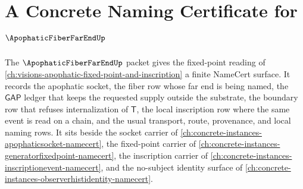 \chapter{A Concrete Naming Certificate for $\ApophaticFiberFarEndUp$}
\label{ch:concrete-instances-apophaticfiberfarend-namecert}

The $\ApophaticFiberFarEndUp$ packet gives the fixed-point reading of \autoref{ch:visions-apophatic-fixed-point-and-inscription} a finite NameCert surface. It records the apophatic socket, the fiber row whose far end is being named, the $\mathsf{GAP}$ ledger that keeps the requested supply outside the substrate, the boundary row that refuses internalization of $\mathsf{T}$, the local inscription row where the same event is read on a chain, and the usual transport, route, provenance, and local naming rows. It sits beside the socket carrier of \autoref{ch:concrete-instances-apophaticsocket-namecert}, the fixed-point carrier of \autoref{ch:concrete-instances-generatorfixedpoint-namecert}, the inscription carrier of \autoref{ch:concrete-instances-inscriptionevent-namecert}, and the no-subject identity surface of \autoref{ch:concrete-instances-observerhistidentity-namecert}.

